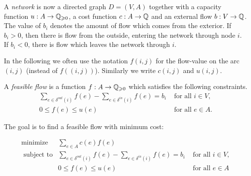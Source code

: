  A \emph{network} is now a
directed graph $D = (V,A)$ together with a capacity function $u: A \to
\mathbb{Q}_{\geqslant0}$, a cost function $c: A \to\mathbb{Q}$ and an external flow $b: V \to \mathbb{Q}$.
The value of $b_i$ denotes the amount of flow which comes from the
exterior. If $b_i>0$, then there is flow from the outside, entering
the network through node $i$. If $b_i<0$, there is flow which leaves
the network through $i$.

In the following we often use the notation $f(i,j)$ for the flow-value
on the arc $(i,j)$ (instead of $f((i,j))$). Similarly we write
$c(i,j)$ and $u(i,j)$. 

A \emph{feasible flow} is a function $f:A \to \mathbb{Q}_{\geqslant0}$ which
satisfies the following constraints. 
\begin{displaymath}  
  \begin{array}{cl}
    \sum_{e \in \delta^{out}(i)} f{(e)} - 
    \sum_{e \in \delta^{in}(i)} f(e) =b_i & 
    \text{ for all } i \in V, \\
    0 \leq f{(e)} \leq u{(e)}              & \text{ for all } e \in A.
  \end{array}
\end{displaymath}


The goal is to find a feasible flow with minimum cost: 


  \begin{displaymath}
    \begin{array}{rcl}
      \text{minimize}     & \sum_{e \in A} c(e) f(e) &     \\
      \text{ subject to}  & \sum_{e \in \delta^{out}(i)} f(e) - \sum_{e\in \delta^{in}(i)} f(e) =b_i & \text{ for all } i \in V,\\
                          & 0 \leq f(e) \leq u(e)              &
                          \text{ for all } e \in A 
    \end{array}
  \end{displaymath}
  


